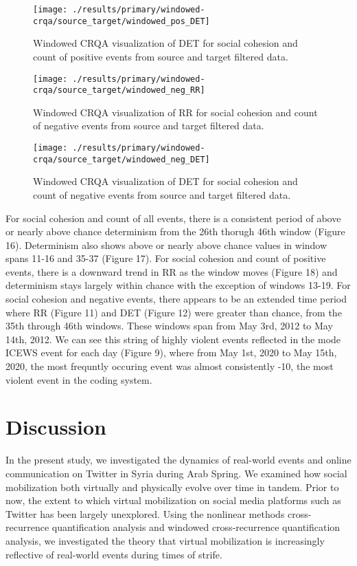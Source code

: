 \documentclass[english,man]{apa6}
\begin{document}
\begin{figure}
\texttt{[image: ./results/primary/windowed-crqa/source\_target/windowed\_pos\_DET]} \caption{Windowed CRQA visualization of DET for social cohesion and count of positive events from source and target filtered data.}\label{fig:plot-DET-source-targ-pos}
\end{figure}

\begin{figure}
\texttt{[image: ./results/primary/windowed-crqa/source\_target/windowed\_neg\_RR]} \caption{Windowed CRQA visualization of RR for social cohesion and count of negative events from source and target filtered data.}\label{fig:plot-RR-source-targ-neg}
\end{figure}

\begin{figure}
\texttt{[image: ./results/primary/windowed-crqa/source\_target/windowed\_neg\_DET]} \caption{Windowed CRQA visualization of DET for social cohesion and count of negative events from source and target filtered data.}\label{fig:plot-DET-source-targ-neg}
\end{figure}

For social cohesion and count of all events, there is a consistent period of above or nearly above chance determinism from the 26th thorugh 46th window (Figure 16). Determinism also shows above or nearly above chance values in window spans 11-16 and 35-37 (Figure 17). For social cohesion and count of positive events, there is a downward trend in RR as the window moves (Figure 18) and determinism stays largely within chance with the exception of windows 13-19. For social cohesion and negative events, there appears to be an extended time period where RR (Figure 11) and DET (Figure 12) were greater than chance, from the 35th through 46th windows. These windows span from May 3rd, 2012 to May 14th, 2012. We can see this string of highly violent events reflected in the mode ICEWS event for each day (Figure 9), where from May 1st, 2020 to May 15th, 2020, the most frequntly occuring event was almost consistently -10, the most violent event in the coding system.

\hypertarget{discussion}{%
\section{Discussion}\label{discussion}}

In the present study, we investigated the dynamics of real-world events and online communication on Twitter in Syria during Arab Spring. We examined how social mobilization both virtually and physically evolve over time in tandem. Prior to now, the extent to which virtual mobilization on social media platforms such as Twitter has been largely unexplored. Using the nonlinear methods cross-recurrence quantification analysis and windowed cross-recurrence quantification analysis, we investigated the theory that virtual mobilization is increasingly reflective of real-world events during times of strife.
\end{document}
